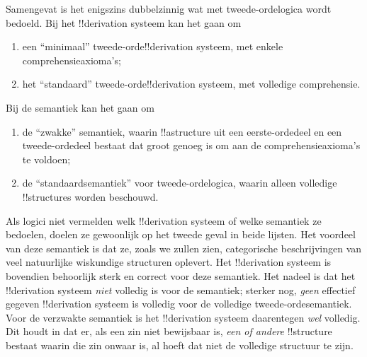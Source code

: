 \documentclass[../../../include/open-logic-section]{subfiles}
\begin{document}
Samengevat is het enigszins dubbelzinnig wat met tweede-ordelogica wordt
bedoeld. Bij het !!{derivation} systeem kan het gaan om
\begin{enumerate}
\item een ``minimaal'' tweede-orde!!{derivation} systeem, met enkele
  comprehensieaxioma's;
\item het ``standaard'' tweede-orde!!{derivation} systeem, met volledige
  comprehensie.
\end{enumerate}
Bij de semantiek kan het gaan om
\begin{enumerate}
\item de ``zwakke'' semantiek, waarin !!a{structure} uit een eerste-ordedeel
  en een tweede-ordedeel bestaat dat groot genoeg is om aan de
  comprehensieaxioma's te voldoen;
\item de ``standaardsemantiek'' voor tweede-ordelogica, waarin alleen
  volledige !!{structure}s worden beschouwd.
\end{enumerate}
Als logici niet vermelden welk !!{derivation} systeem of welke semantiek ze
bedoelen, doelen ze gewoonlijk op het tweede geval in beide lijsten. Het
voordeel van deze semantiek is dat ze, zoals we zullen zien, categorische
beschrijvingen van veel natuurlijke wiskundige structuren oplevert. Het
!!{derivation} systeem is bovendien behoorlijk sterk en correct voor deze
semantiek. Het nadeel is dat het !!{derivation} systeem \emph{niet} volledig
is voor de semantiek; sterker nog, \emph{geen} effectief gegeven
!!{derivation} systeem is volledig voor de volledige tweede-ordesemantiek.
Voor de verzwakte semantiek is het !!{derivation} systeem daarentegen
\emph{wel} volledig. Dit houdt in dat er, als een zin niet bewijsbaar is,
\emph{een of andere} !!{structure} bestaat waarin die zin onwaar is, al hoeft
dat niet de volledige structuur te zijn.
\end{document}
